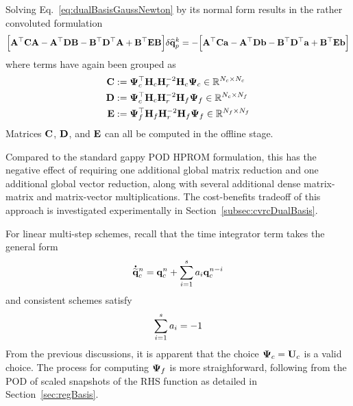 Solving Eq.~\ref{eq:dualBasisGaussNewton} by its normal form results in the rather convoluted formulation
\begin{equation}\label{eq:dualBasisNormal}
	\Big[ \mathbf{A}^\top \mathbf{C} \mathbf{A} - \mathbf{A}^\top \mathbf{D} \mathbf{B} - \mathbf{B}^\top \mathbf{D}^\top \mathbf{A} + \mathbf{B}^\top \mathbf{E} \mathbf{B} \Big] \delta \mathbf{\widehat{q}}_{p}^{k} = -\Big[ \mathbf{A}^\top \mathbf{C} \mathbf{a} - \mathbf{A}^\top \mathbf{D} \mathbf{b} - \mathbf{B}^\top \mathbf{D}^\top \mathbf{a} + \mathbf{B}^\top \mathbf{E} \mathbf{b} \Big]
\end{equation}
%
where terms have again been grouped as
%
\begin{align}
	\dummyMatThree &\defEq \deimBasisCons^\top \consScale \resScale^{-2} \consScale \deimBasisCons \inRTwo{\numConsModes}{\numConsModes} \\
	\dummyMatFour &\defEq \deimBasisCons^\top \consScale \resScale^{-2} \rhsScale \deimBasisRhs \inRTwo{\numConsModes}{\numRHSModes} \\
	\dummyMatFive &\defEq \deimBasisRhs^\top \rhsScale \resScale^{-2} \rhsScale \deimBasisRhs \inRTwo{\numRHSModes}{\numRHSModes}
\end{align}
%
Matrices $\mathbf{C}$, $\mathbf{D}$, and $\mathbf{E}$ can all be computed in the offline stage.

Compared to the standard gappy POD HPROM formulation, this has the negative effect of requiring one additional global matrix reduction and one additional global vector reduction, along with several additional dense matrix-matrix and matrix-vector multiplications. The cost-benefits tradeoff of this approach is investigated experimentally in Section~\ref{subsec:cvrcDualBasis}.

For linear multi-step schemes, recall that the time integrator term takes the general form
%
\begin{equation}
	\accentset{\mbox{\large\bfseries .}}{\mathbf{\widetilde{q}}}_{c}^{n} = \mathbf{q}_{c}^{n} + \sum_{i=1}^{s} a_{i} \mathbf{q}_{c}^{n-i}
\end{equation}
%
and consistent schemes satisfy
%
\begin{equation}
	\sum_{i=1}^{s} a_{i} = -1
\end{equation}
%
From the previous discussions, it is apparent that the choice $\deimBasisCons = \consTrial$ is a valid choice. The process for computing $\deimBasisRhs$ is more straighforward, following from the POD of scaled snapshots of the RHS function as detailed in Section~\ref{sec:regBasis}.

